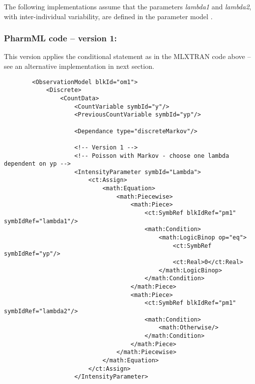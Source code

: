 \myEndLine

The following \pharmml implementations assume that the parameters \emph{lambda1} 
and \emph{lambda2}, with inter-individual variability, are defined in the parameter 
model .

\subsubsection{PharmML code -- version 1:}
This version applies the conditional statement as in the MLXTRAN code above 
-- see an alternative implementation in next section. 

\lstset{language=XML}
\begin{lstlisting}	
        <ObservationModel blkId="om1">
            <Discrete>
                <CountData>
                    <CountVariable symbId="y"/>
                    <PreviousCountVariable symbId="yp"/>
                    
                    <Dependance type="discreteMarkov"/>
                    
                    <!-- Version 1 -->
                    <!-- Poisson with Markov - choose one lambda dependent on yp -->
                    <IntensityParameter symbId="Lambda">
                        <ct:Assign>
                            <math:Equation>
                                <math:Piecewise>
                                    <math:Piece>
                                        <ct:SymbRef blkIdRef="pm1" symbIdRef="lambda1"/>
                                        <math:Condition>
                                            <math:LogicBinop op="eq">
                                                <ct:SymbRef symbIdRef="yp"/>
                                                <ct:Real>0</ct:Real>
                                            </math:LogicBinop>
                                        </math:Condition>
                                    </math:Piece>
                                    <math:Piece>
                                        <ct:SymbRef blkIdRef="pm1" symbIdRef="lambda2"/>
                                        <math:Condition>
                                            <math:Otherwise/>
                                        </math:Condition>
                                    </math:Piece>
                                </math:Piecewise>
                            </math:Equation>
                        </ct:Assign>
                    </IntensityParameter>
                    

\end{lstlisting}
